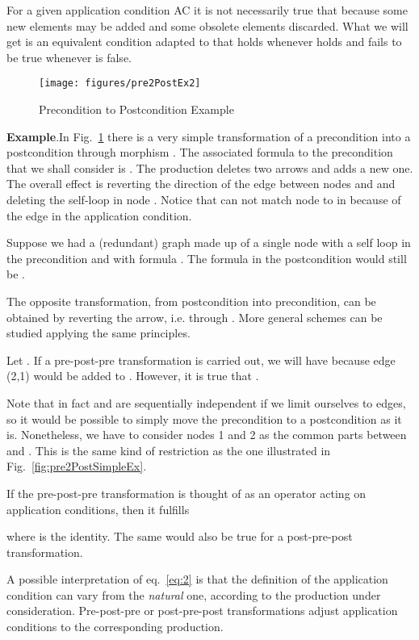 \documentclass{fundam}
\newcommand{\proofend}{\hfill}
\begin{document}
For a given application condition AC it is not necessarily true that
 because some new elements may be added and some
obsolete elements discarded.  What we will get is an equivalent
condition adapted to  that holds whenever  holds and fails to be
true whenever  is false.

\begin{figure}[htbp]
  \centering
  \texttt{[image: figures/pre2PostEx2]}
  \caption{Precondition to Postcondition Example}
  \label{fig:pre2PostEx}
\end{figure}

\noindent\textbf{Example}.In Fig.~\ref{fig:pre2PostEx} there
is a very simple transformation of a precondition into a postcondition
through morphism . The associated formula to the precondition
 that we shall consider is
. The production
deletes two arrows and adds a new one. The overall effect is reverting
the direction of the edge between nodes  and  and deleting the
self-loop in node . Notice that  can not match node  to
 in  because of the edge  in the application condition.

Suppose we had a (redundant) graph  made up of a single node 
with a self loop in the precondition and with formula
. The formula
in the postcondition would still be
.

The opposite transformation, from postcondition into precondition, can
be obtained by reverting the arrow, i.e. through .  More
general schemes can be studied applying the same principles.

Let . If a pre-post-pre transformation is carried out, we will
have  because edge (2,1)
would be added to . However, it is true that
.

Note that in fact  and  are
sequentially independent if we limit ourselves to edges, so it would
be possible to simply move the precondition to a postcondition as it
is. Nonetheless, we have to consider nodes 1 and 2 as the common parts
between  and . This is the same kind of
restriction as the one illustrated in
Fig.~\ref{fig:pre2PostSimpleEx}. \proofend

If the pre-post-pre transformation is thought of as an operator 
acting on application conditions, then it fulfills

where  is the identity. The same would also be true for a
post-pre-post transformation.

A possible interpretation of eq.~\eqref{eq:2} is that the definition
of the application condition can vary from the \emph{natural} one,
according to the production under consideration. Pre-post-pre or
post-pre-post transformations adjust application conditions to the
corresponding production.
\end{document}
